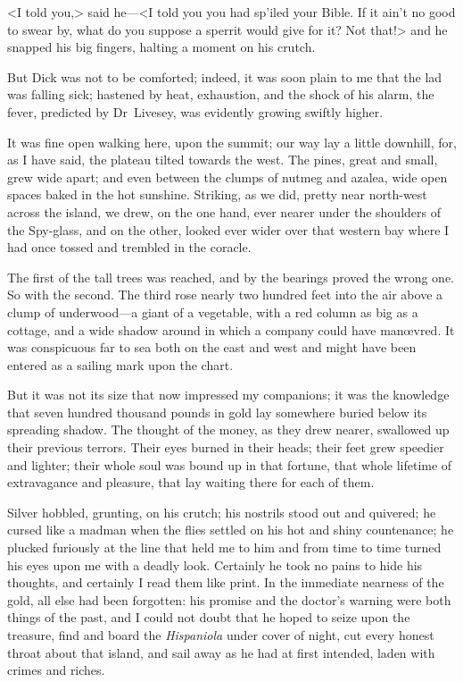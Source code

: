 <I told you,> said he—<I told you you had sp'iled your Bible. If it ain't no good to swear by, what do you suppose a sperrit would give for it? Not that!> and he snapped his big fingers, halting a moment on his crutch.

But Dick was not to be comforted; indeed, it was soon plain to me that the lad was falling sick; hastened by heat, exhaustion, and the shock of his alarm, the fever, predicted by Dr~Livesey, was evidently growing swiftly higher.

It was fine open walking here, upon the summit; our way lay a little downhill, for, as I have said, the plateau tilted towards the west. The pines, great and small, grew wide apart; and even between the clumps of nutmeg and azalea, wide open spaces baked in the hot sunshine. Striking, as we did, pretty near north-west across the island, we drew, on the one hand, ever nearer under the shoulders of the Spy-glass, and on the other, looked ever wider over that western bay where I had once tossed and trembled in the coracle.

The first of the tall trees was reached, and by the bearings proved the wrong one. So with the second. The third rose nearly two hundred feet into the air above a clump of underwood—a giant of a vegetable, with a red column as big as a cottage, and a wide shadow around in which a company could have manœvred. It was conspicuous far to sea both on the east and west and might have been entered as a sailing mark upon the chart.

But it was not its size that now impressed my companions; it was the knowledge that seven hundred thousand pounds in gold lay somewhere buried below its spreading shadow. The thought of the money, as they drew nearer, swallowed up their previous terrors. Their eyes burned in their heads; their feet grew speedier and lighter; their whole soul was bound up in that fortune, that whole lifetime of extravagance and pleasure, that lay waiting there for each of them.

Silver hobbled, grunting, on his crutch; his nostrils stood out and quivered; he cursed like a madman when the flies settled on his hot and shiny countenance; he plucked furiously at the line that held me to him and from time to time turned his eyes upon me with a deadly look. Certainly he took no pains to hide his thoughts, and certainly I read them like print. In the immediate nearness of the gold, all else had been forgotten: his promise and the doctor's warning were both things of the past, and I could not doubt that he hoped to seize upon the treasure, find and board the \textit{Hispaniola} under cover of night, cut every honest throat about that island, and sail away as he had at first intended, laden with crimes and riches.

